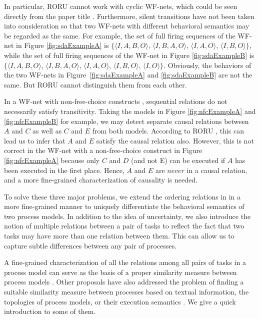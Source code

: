 \documentclass{llncs}
\begin{document}
In particular, RORU cannot work with cyclic WF-nets, which could be seen directly from the paper title \cite{jin2014computing}. Furthermore, silent transitions have not been taken into consideration so that two WF-nets with different behavioral semantics may be regarded as the same. For example, the set of full firing sequences of the WF-net in Figure \ref{fig:sdaExampleA} is $\{\langle I,A,B,O\rangle$, $\langle I,B,A,O\rangle$, $\langle I,A,O\rangle$, $\langle I,B,O\rangle\}$, while the set of full firing sequences of the WF-net in Figure \ref{fig:sdaExampleB} is $\{\langle I,A,B,O\rangle$, $\langle I,B,A,O\rangle$, $\langle I,A,O\rangle$, $\langle I,B,O\rangle$, $\langle I,O\rangle\}$. Obviously, the behaviors of the two WF-nets in Figure~\ref{fig:sdaExampleA} and \ref{fig:sdaExampleB} are not the same. But RORU cannot distinguish them from each other.

In a WF-net with non-free-choice constructs \cite{de2003workflow}, sequential relations do not necessarily satisfy transitivity. Taking the models in Figure \ref{fig:nfcExampleA} and \ref{fig:nfcExampleB} for example, we may detect separate causal relations between $A$ and $C$ as well as $C$ and $E$ from both models. According to RORU \cite{jin2014computing}, this can lead us to infer that $A$ and $E$ satisfy the causal relation also. However, this is not correct in the WF-net with a non-free-choice construct in Figure \ref{fig:nfcExampleA} because only $C$ and $D$ (and not E) can be executed if $A$ has been executed in the first place. Hence, $A$ and $E$ are $never$ in a causal relation, and a more fine-grained characterization of causality is needed. 

To solve these three major problems, we extend the ordering relations in \cite{jin2014computing} in a more fine-grained manner to uniquely differentiate the behavioral semantics of two process models. In addition to the idea of uncertainty, we also introduce the notion of multiple relations between a pair of tasks to reflect the fact that two tasks may have more than one relation between them.  This can allow us to capture subtle differences between any pair of processes.

A fine-grained characterization of all the relations among all pairs of tasks in a process model can serve as the basis of a proper similarity measure between process models \cite{dijkman2014managing}. Other proposals have also addressed the problem of finding a suitable similarity measure between processes based on textual information, the topologies of process models, or their execution semantics \cite{weidlich2011efficient}. We give a quick introduction to some of them.
\end{document}
